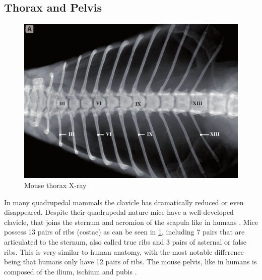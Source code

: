 \subsection{Thorax and Pelvis}
\label{s:b-mouse-th-pel}
\begin{figure}[h]
	\centerline{
		\includegraphics[scale=0.6]{images/mouseThorax.png}}
	\caption{Mouse thorax X-ray \cite{harrisonVertebralLandmarksIdentification2013}}\label{fig:mouseThorax}
\end{figure}

\noindent
In many quadrupedal mammals the clavicle has dramatically reduced or even disappeared.
Despite their quadrupedal nature mice have a well-developed clavicle,
that joins the sternum and acromion of the scapula like in humans \cite{ruberteBridgingMouseHuman2023}.
Mice possess 13 pairs of ribs (costae) as can be seen in \cref{fig:mouseThorax}, including 7 pairs that are articulated to the sternum, also called true ribs
and 3 pairs of asternal or false ribs.
This is very similar to human anatomy, with the most notable difference being that humans only have 12 pairs of ribs.
The mouse pelvis, like in humans is composed of the ilium, ischium and pubis \cite{platzerTaschenatlasAnatomieBd2013,ruberteMorphologicalMousePhenotyping2017,halleOpenAnatomyBrowser2017}.


